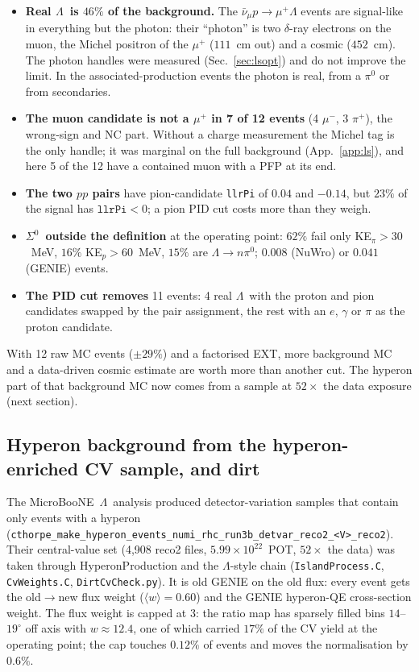 \documentclass[11pt,a4paper]{article}
\newcommand{\Szero}{\ensuremath{\Sigma^{0}}}
\newcommand{\Lam}{\ensuremath{\Lambda}}
\newcommand{\uboone}{MicroBooNE}
\newcommand{\numubar}{\ensuremath{\bar{\nu}_\mu}}
\begin{document}
\begin{itemize}
  \item \textbf{Real \Lam\ is $46\%$ of the background.} The $\numubar p\to\mu^+\Lam$ events
        are signal-like in everything but the photon: their ``photon'' is two $\delta$-ray
        electrons on the muon, the Michel positron of the $\mu^+$ ($111$~cm out) and a cosmic
        ($452$~cm). The photon handles were measured (Sec.~\ref{sec:lsopt}) and do not improve
        the limit. In the associated-production events the photon is real, from a $\pi^0$ or
        from secondaries.
  \item \textbf{The muon candidate is not a $\mu^+$ in 7 of 12 events} (4 $\mu^-$, 3
        $\pi^+$), the wrong-sign and NC part. Without a charge measurement the Michel tag is
        the only handle; it was marginal on the full background (App.~\ref{app:ls}), and here 5
        of the 12 have a contained muon with a PFP at its end.
  \item \textbf{The two $pp$ pairs} have pion-candidate \texttt{llrPi} of $0.04$ and $-0.14$,
        but $23\%$ of the signal has $\texttt{llrPi}<0$; a pion PID cut costs more than they
        weigh.
  \item \textbf{\Szero\ outside the definition} at the operating point: $62\%$ fail only
        KE$_\pi>30$~MeV, $16\%$ KE$_p>60$~MeV, $15\%$ are $\Lam\to n\pi^0$; $0.008$ (NuWro) or
        $0.041$ (GENIE) events.
  \item \textbf{The PID cut removes} 11 events: 4 real \Lam\ with the proton and pion
        candidates swapped by the pair assignment, the rest with an $e$, $\gamma$ or $\pi$ as
        the proton candidate.
\end{itemize}
With 12 raw MC events ($\pm29\%$) and a factorised EXT, more background MC and a data-driven
cosmic estimate are worth more than another cut. The hyperon part of that background MC now
comes from a sample at $52\times$ the data exposure (next section).

\subsection{Hyperon background from the hyperon-enriched CV sample, and dirt}
\label{sec:lscv}
The \uboone\ \Lam\ analysis produced detector-variation samples that contain only events with a
hyperon (\texttt{cthorpe\_make\_hyperon\_events\_numi\_rhc\_run3b\_detvar\_reco2\_<V>\_reco2}).
Their central-value set (4,908 reco2 files, $5.99\times10^{22}$~POT, $52\times$ the data) was
taken through HyperonProduction and the \Lam-style chain (\texttt{IslandProcess.C},
\texttt{CvWeights.C}, \texttt{DirtCvCheck.py}). It is old GENIE on the old flux: every event gets
the old$\to$new flux weight ($\langle w\rangle=0.60$) and the GENIE hyperon-QE cross-section
weight. The flux weight is capped at 3: the ratio map has sparsely filled bins $14$--$19^\circ$
off axis with $w\approx12.4$, one of which carried $17\%$ of the CV yield at the operating point;
the cap touches $0.12\%$ of events and moves the normalisation by $0.6\%$.
\end{document}
